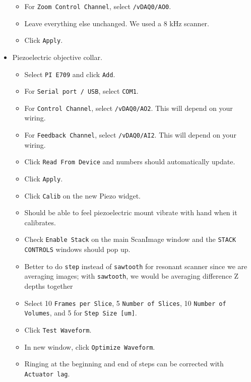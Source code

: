 \documentclass[10pt,letterpaper]{article}
\begin{document}
\begin{itemize}
\begin{itemize}
        \item For \texttt{Zoom Control Channel}, select \texttt{/vDAQ0/AO0}.
        \item Leave everything else unchanged. We used a 8 kHz scanner.
        \item Click \texttt{Apply}.
    \end{itemize}
    \item Piezoelectric objective collar.
    \begin{itemize}
        \item Select \texttt{PI E709} and click \texttt{Add}.
        \item For \texttt{Serial port / USB}, select \texttt{COM1}.
        \item For \texttt{Control Channel}, select \texttt{/vDAQ0/AO2}. This will depend on your wiring.
        \item For \texttt{Feedback Channel}, select \texttt{/vDAQ0/AI2}. This will depend on your wiring.
        \item Click \texttt{Read From Device} and numbers should automatically update.
        \item Click \texttt{Apply}.
        \item Click \texttt{Calib} on the new Piezo widget.
        \item Should be able to feel piezoelectric mount vibrate with hand when it calibrates.
        \item Check \texttt{Enable Stack} on the main ScanImage window and the \texttt{STACK CONTROLS} windows should pop up.
        \item Better to do \texttt{step} instead of \texttt{sawtooth} for resonant scanner since we are averaging images; with \texttt{sawtooth}, we would be averaging difference Z depths together
        \item Select 10 \texttt{Frames per Slice}, 5 \texttt{Number of Slices}, 10 \texttt{Number of Volumes}, and 5 for \texttt{Step Size [um]}.
        \item Click \texttt{Test Waveform}.
        \item In new window, click \texttt{Optimize Waveform}.
        \item Ringing at the beginning and end of steps can be corrected with \texttt{Actuator lag}.
    \end{itemize}


\end{itemize}
\end{document}
